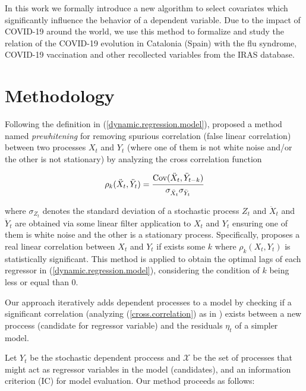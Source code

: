 \documentclass[a4paper]{easychair}
\begin{document}


In this work we formally introduce a new algorithm to select covariates which significantly influence the behavior of a dependent variable. Due to the impact of COVID-19 around the world, we use this method to formalize and study the relation of the COVID-19 evolution in Catalonia (Spain) with the flu syndrome, COVID-19 vaccination and other recollected variables from the IRAS database.

\section{Methodology}

Following the definition in (\ref{dynamic.regression.model}), \cite{cryer2008time} proposed a method named \textit{prewhitening} for removing spurious correlation (false linear correlation) between two processes $X_t$ and $Y_t$ (where one of them is not white noise and/or the other is not stationary) by analyzing the cross correlation function 

\begin{equation}\label{cross.correlation}
\rho_k(\ddot{X}_t, \ddot{Y}_t) =  \cfrac{\text{Cov}(\ddot{X}_t, \ddot{Y}_{t-k})}{\sigma_{\ddot{X}_t} \sigma_{\ddot{Y}_t}}
\end{equation}

\noindent where $\sigma_{Z_t}$ denotes the standard deviation of a stochastic process $Z_t$ and $\ddot{X}_t$ and $\ddot{Y}_t$ are obtained via some linear filter application to $X_t$ and $Y_t$ ensuring one of them is white noise and the other is a stationary process. Specifically, \cite{cryer2008time} proposes a real linear correlation between $X_t$ and $Y_t$ if exists some $k$ where $\rho_k(X_t, Y_t)$ is statistically significant. This method is applied to obtain the optimal lags of each regressor in (\ref{dynamic.regression.model}), considering the condition of $k$ being less or equal than $0$.

Our approach iteratively adds dependent processes to a model by checking if a significant correlation (analyzing (\ref{cross.correlation}) as in \cite{cryer2008time}) exists between a new proccess (candidate for regressor variable) and the residuals $\eta_t$ of a simpler model.

Let $Y_t$ be the stochastic dependent proccess and $\mathcal{X}$ be the set of processes that might act as regressor variables in the model (candidates), and an information criterion (IC) for model evaluation. Our method proceeds as follows:
\end{document}
